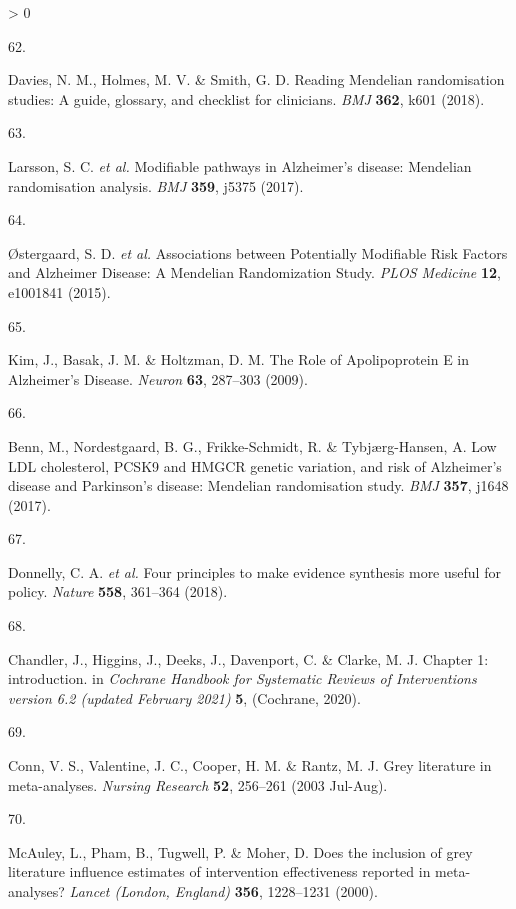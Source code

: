 \documentclass[a4paper, twoside]{templates/ociamthesis}
\newlength{\cslhangindent}
\newlength{\csllabelwidth}
\newenvironment{CSLReferences}[3] %
 {%
  \setlength{\parindent}{0pt}
  \ifodd #1 \everypar{\setlength{\hangindent}{\cslhangindent}}\ignorespaces\fi
  \ifnum #2 > 0
  \setlength{\parskip}{#2\baselineskip}
  \fi
 }%
 {}
\newcommand{\CSLLeftMargin}[1]{\parbox[t]{\maxof{\widthof{#1}}{\csllabelwidth}}{#1}}
\newcommand{\CSLRightInline}[1]{\parbox[t]{\linewidth - \csllabelwidth}{#1}}
\begin{document}
\begin{CSLReferences}{0}{0}
\leavevmode\hypertarget{ref-davies2018}{}%
\CSLLeftMargin{62. }
\CSLRightInline{Davies, N. M., Holmes, M. V. \& Smith, G. D. Reading {Mendelian} randomisation studies: A guide, glossary, and checklist for clinicians. \emph{BMJ} \textbf{362}, k601 (2018).}

\leavevmode\hypertarget{ref-larsson2017c}{}%
\CSLLeftMargin{63. }
\CSLRightInline{Larsson, S. C. \emph{et al.} Modifiable pathways in {Alzheimer}'s disease: Mendelian randomisation analysis. \emph{BMJ} \textbf{359}, j5375 (2017).}

\leavevmode\hypertarget{ref-ostergaard2015}{}%
\CSLLeftMargin{64. }
\CSLRightInline{Østergaard, S. D. \emph{et al.} Associations between {Potentially Modifiable Risk Factors} and {Alzheimer Disease}: A {Mendelian Randomization Study}. \emph{PLOS Medicine} \textbf{12}, e1001841 (2015).}

\leavevmode\hypertarget{ref-kim2009}{}%
\CSLLeftMargin{65. }
\CSLRightInline{Kim, J., Basak, J. M. \& Holtzman, D. M. The {Role} of {Apolipoprotein E} in {Alzheimer}'s {Disease}. \emph{Neuron} \textbf{63}, 287--303 (2009).}

\leavevmode\hypertarget{ref-benn2017}{}%
\CSLLeftMargin{66. }
\CSLRightInline{Benn, M., Nordestgaard, B. G., Frikke-Schmidt, R. \& Tybjærg-Hansen, A. Low {LDL} cholesterol, {PCSK9} and {HMGCR} genetic variation, and risk of {Alzheimer}'s disease and {Parkinson}'s disease: Mendelian randomisation study. \emph{BMJ} \textbf{357}, j1648 (2017).}

\leavevmode\hypertarget{ref-donnelly2018a}{}%
\CSLLeftMargin{67. }
\CSLRightInline{Donnelly, C. A. \emph{et al.} Four principles to make evidence synthesis more useful for policy. \emph{Nature} \textbf{558}, 361--364 (2018).}

\leavevmode\hypertarget{ref-chandler2019chapter}{}%
\CSLLeftMargin{68. }
\CSLRightInline{Chandler, J., Higgins, J., Deeks, J., Davenport, C. \& Clarke, M. J. Chapter 1: introduction. in \emph{Cochrane {Handbook} for {Systematic Reviews} of {Interventions} version 6.2 (updated {February} 2021)} \textbf{5}, ({Cochrane}, 2020).}

\leavevmode\hypertarget{ref-conn2003}{}%
\CSLLeftMargin{69. }
\CSLRightInline{Conn, V. S., Valentine, J. C., Cooper, H. M. \& Rantz, M. J. Grey literature in meta-analyses. \emph{Nursing Research} \textbf{52}, 256--261 (2003 Jul-Aug).}

\leavevmode\hypertarget{ref-mcauley2000}{}%
\CSLLeftMargin{70. }
\CSLRightInline{McAuley, L., Pham, B., Tugwell, P. \& Moher, D. Does the inclusion of grey literature influence estimates of intervention effectiveness reported in meta-analyses? \emph{Lancet (London, England)} \textbf{356}, 1228--1231 (2000).}


\end{CSLReferences}
\end{document}
